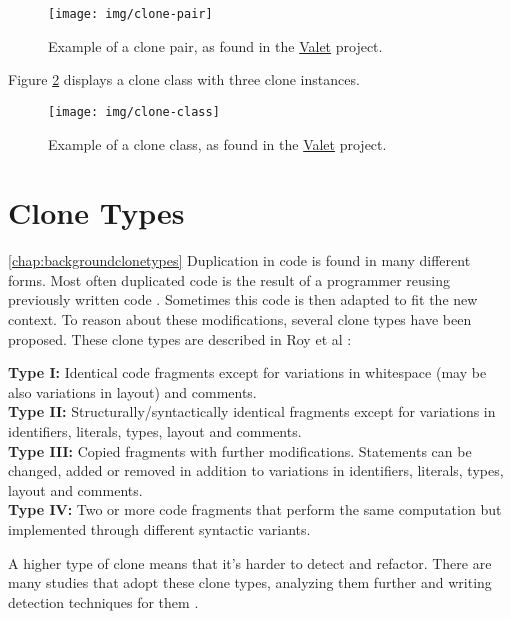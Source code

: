 \begin{figure}[H]
	\centering
	\texttt{[image: img/clone-pair]}
	\caption{Example of a clone pair, as found in the \href{https://github.com/Widen/valet}{Valet} project.}
	\label{fig:clonepair}
\end{figure}

Figure \ref{fig:cloneclass} displays a clone class with three clone instances.

\begin{figure}[H]
	\centering
	\texttt{[image: img/clone-class]}
	\caption{Example of a clone class, as found in the \href{https://github.com/Widen/valet}{Valet} project.}
	\label{fig:cloneclass}
\end{figure}

\section{Clone Types} \ref{chap:backgroundclonetypes}
Duplication in code is found in many different forms. Most often duplicated code is the result of a programmer reusing previously written code \cite{haefliger2008code, baxter1998clone}. Sometimes this code is then adapted to fit the new context. To reason about these modifications, several clone types have been proposed. These clone types are described in Roy et al \cite{roy2007survey}:
\begin{displayquote}
\textbf{Type I:} Identical code fragments except for variations in whitespace (may be also variations in layout) and comments.\\
\textbf{Type II:} Structurally/syntactically identical fragments except for variations in identifiers, literals, types, layout and comments.\\
\textbf{Type III:} Copied fragments with further modifications. Statements can be changed, added or removed in addition to variations in identifiers, literals, types, layout and comments.\\
\textbf{Type IV:} Two or more code fragments that perform the same computation but implemented through different syntactic variants.
\end{displayquote}
A higher type of clone means that it's harder to detect and refactor. There are many studies that adopt these clone types, analyzing them further and writing detection techniques for them \cite{sajnani2016sourcerercc, kodhai2010detection, van2019novel}.

